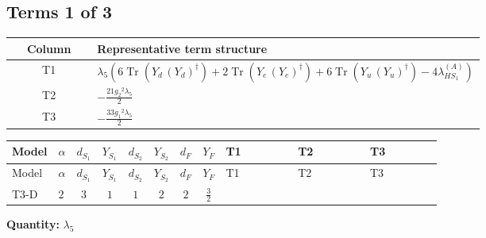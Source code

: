 \documentclass[8pt]{article}
\begin{document}
\begin{landscape}
\subsection*{Terms 1 of 3}
\begin{center}
\begin{tabular}{@{}c >{\raggedright\arraybackslash}p{0.82\linewidth}@{}}
\toprule
Column & Representative term structure \\
\midrule
T1 & \(\displaystyle {\lambda_5} (6 \operatorname{Tr}\!\left({Y_d}\,\left({Y_d}\right)^{\dagger}\right)+2 \operatorname{Tr}\!\left({Y_e}\,\left({Y_e}\right)^{\dagger}\right)+6 \operatorname{Tr}\!\left({Y_u}\,\left({Y_u}\right)^{\dagger}\right)-4 {\lambda_{HS_1}^{(A)}})\) \\
\midrule
T2 & \(\displaystyle -\frac{21 {g_2}^2 {\lambda_5}}{2}\) \\
\midrule
T3 & \(\displaystyle -\frac{33 {g_1}^2 {\lambda_5}}{2}\) \\
\midrule
\bottomrule
\end{tabular}
\end{center}
\smallskip
\tiny
\begin{longtable}{@{}llcccccc >{\raggedright\arraybackslash}p{0.21\linewidth} >{\raggedright\arraybackslash}p{0.21\linewidth} >{\raggedright\arraybackslash}p{0.21\linewidth}@{}}
\toprule
Model & $\alpha$ & $d_{S_1}$ & $Y_{S_1}$ & $d_{S_2}$ & $Y_{S_2}$ & $d_F$ & $Y_F$ & T1 & T2 & T3 \\
\midrule
\endfirsthead
\toprule
Model & $\alpha$ & $d_{S_1}$ & $Y_{S_1}$ & $d_{S_2}$ & $Y_{S_2}$ & $d_F$ & $Y_F$ & T1 & T2 & T3 \\
\midrule
\endhead
T3-D & $2$ & $3$ & $1$ & $1$ & $2$ & $2$ & $\frac{3}{2}$ & \scriptsize\adjustbox{max width=\linewidth}{$\begin{gathered} {\lambda_5} (6 \operatorname{Tr}\!\left({Y_d}\,\left({Y_d}\right)^{\dagger}\right)+2 \operatorname{Tr}\!\left({Y_e}\,\left({Y_e}\right)^{\dagger}\right)+6 \operatorname{Tr}\!\left({Y_u}\,\left({Y_u}\right)^{\dagger}\right)-4 {\lambda_{HS_1}^{(A)}})\end{gathered}$} & \scriptsize\adjustbox{max width=\linewidth}{$\begin{gathered} -\frac{21 {g_2}^2 {\lambda_5}}{2}\end{gathered}$} & \scriptsize\adjustbox{max width=\linewidth}{$\begin{gathered} -\frac{33 {g_1}^2 {\lambda_5}}{2}\end{gathered}$} \\
\midrule
\bottomrule
\end{longtable}
\clearpage
\noindent\textbf{Quantity: }$\lambda_5$\par\smallskip

\end{landscape}
\end{document}
